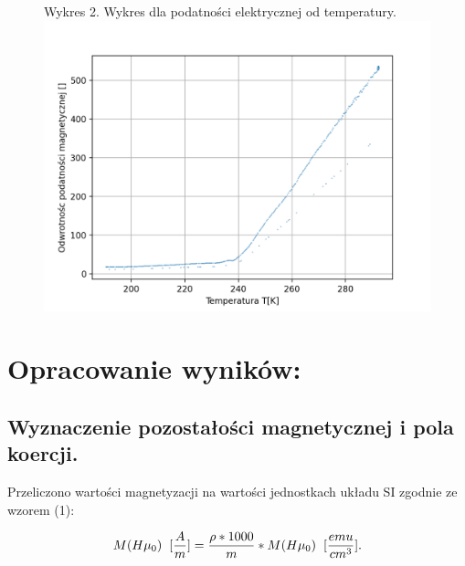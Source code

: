 \documentclass[a4paper]{article}
\begin{document}
\begin{figure}[H]
    \centering
    Wykres 2. Wykres dla podatności elektrycznej od temperatury.
    \includegraphics[width = 12cm]{podatnosc_dane.png}
    \label{fig:my_label}
\end{figure}


\section{Opracowanie wyników:}

\subsection{Wyznaczenie pozostałości magnetycznej i pola koercji.}


Przeliczono wartości magnetyzacji na wartości jednostkach układu SI zgodnie ze wzorem (1):

\begin{equation}
    M(H\mu_0) \hspace{0.2cm} [\frac{A}{m}] = \frac{\rho*1000}{m}* M(H\mu_0) \hspace{0.2cm} [\frac{emu}{cm^3}].
\end{equation}
\end{document}
